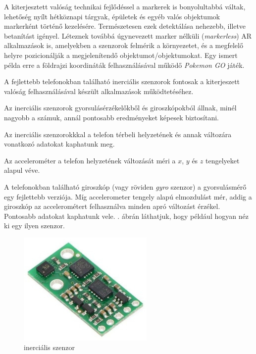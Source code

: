 
A kiterjesztett valóság technikai fejlődéssel a markerek is bonyolultabbá váltak, lehetőség nyílt hétköznapi tárgyak, épületek és egyéb valós objektumok markerként történő kezelésére.
Természetesen ezek detektálása nehezebb, illetve betanítást igényel.
Léteznek továbbá úgynevezett marker nélküli (\textit{markerless}) AR alkalmazások is, amelyekben a szenzorok felmérik a környezetet, és a megfelelő helyre pozicionálják a megjelenítendő objektumot/objektumokat. Egy ismert példa erre a földrajzi koordináták felhasználásával működő \textit{Pokemon GO} játék.


A fejlettebb telefonokban található inerciális szenzorok fontosak a kiterjeszett valóság felhasználásával készült alkalmazások működtetéséhez.

Az inerciális szenzorok gyorsulásérzékelőkből és giroszkópokból állnak, minél nagyobb a számuk, annál pontosabb eredményeket képesek biztosítani.

Az inerciális szenzorokkkal a telefon térbeli helyzetének és annak változára vonatkozó adatokat kaphatunk meg.

Az accelerométer a telefon helyzetének változását méri a $x$, $y$ és $z$ tengelyeket alapul véve.

A telefonokban található giroszkóp (vagy röviden \textit{gyro} szenzor) a gyorsulásmérő egy fejlettebb verziója.
Míg accelerometer tengely alapú elmozdulást mér, addig a giroszkóp az accelerométert felhasználva minden apró változást érzékel. Pontosabb adatokat kaphatunk vele.
. ábrán láthatjuk, hogy például hogyan néz ki egy ilyen szenzor.

\begin{figure}[htp]
    \centering
   	\includegraphics[scale=3]{images/inertial.jpg}
	\caption{inerciális szenzor}
	\label{fig:inertial}
\end{figure}

